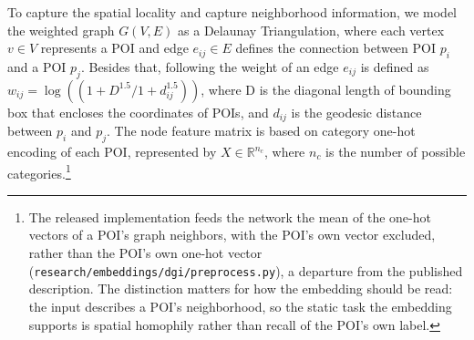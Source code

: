 To capture the spatial locality and capture neighborhood information, we model the weighted graph $G(V, E)$ as a Delaunay Triangulation, where each vertex $v \in V$ represents a POI and edge $e_{ij} \in E$ defines the connection between POI $p_i$ and a POI $p_j$. Besides that, following \cite{huang2022estimating} the weight of an edge $e_{ij}$ is defined as $w_{ij} = \log((1+D^{1.5}/1+d_{ij}^{1.5}))$, where D is the diagonal length of bounding box that encloses the coordinates of POIs, and $d_{ij}$ is the geodesic distance between $p_{i}$ and $p_{j}$. The node feature matrix is based on category one-hot encoding of each POI, represented by $X \in \mathbb{R}^{n_c}$, where $n_c$ is the number of possible categories.\footnote{The released implementation feeds the network the mean of the one-hot vectors of a POI's graph neighbors, with the POI's own vector excluded, rather than the POI's own one-hot vector (\texttt{research/embeddings/dgi/preprocess.py}), a departure from the published description. The distinction matters for how the embedding should be read: the input describes a POI's neighborhood, so the static task the embedding supports is spatial homophily rather than recall of the POI's own label.}

